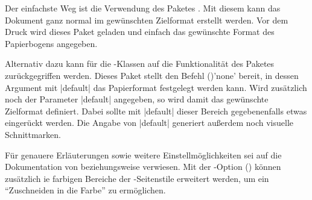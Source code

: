 Der einfachste Weg ist die Verwendung des Paketes . Mit diesem 
kann das Dokument ganz normal im gewünschten Zielformat erstellt werden. Vor 
dem Druck wird dieses Paket geladen und einfach das gewünschte Format des 
Papierbogens angegeben. 
%
\begin{quoting}
\end{quoting}
%
Alternativ dazu kann für die \TUDScript-Klassen auf die Funktionalität des 
Paketes  zurückgegriffen werden. Dieses Paket stellt den 
Befehl ()'none' bereit, in dessen Argument mit
|default|
das Papierformat festgelegt werden kann. Wird zusätzlich noch der Parameter 
|default|
angegeben, so wird damit das gewünschte Zielformat definiert. Dabei sollte mit
|default|
dieser Bereich gegebenenfalls etwas eingerückt werden. Die Angabe von 
|default|
generiert außerdem noch visuelle Schnittmarken. 
%
\begin{quoting}
\end{quoting}
%
Für genauere Erläuterungen sowie weitere Einstellmöglichkeiten sei auf die 
Dokumentation von  beziehungsweise  verwiesen.
Mit der \TUDScript-Option () können
zusätzlich ie farbigen Bereiche der -Seitenstile 
erweitert werden, um ein \enquote{Zuschneiden in die Farbe} zu ermöglichen.



